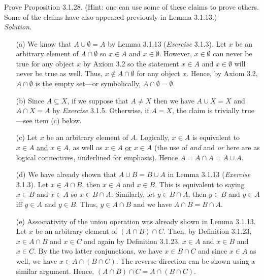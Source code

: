 \documentclass{amsart}
\theoremstyle{definition}
\newcommand{\soln}{\newline\textit{Solution.} }
\begin{document}
\subsubsection{} Prove Proposition 3.1.28. (Hint: one can use some of these claims to prove others. Some of the claims have also appeared previously in Lemma 3.1.13.) \\
\soln
\begin{enumerate}
\item[(a)] We know that $A\cup\emptyset=A$ by Lemma 3.1.13 (\textit{Exercise} 3.1.3). Let $x$ be an arbitrary element of $A\cap\emptyset$ so $x\in A$ and $x\in\emptyset$. However, $x\in\emptyset$ can never be true for any object $x$ by Axiom 3.2 so the statement $x\in A$ and $x\in\emptyset$ will never be true as well. Thus, $x\notin A\cap\emptyset$ for any object $x$. Hence, by Axiom 3.2, $A\cap\emptyset$ is the empty set---or symbolically, $A\cap\emptyset=\emptyset$. \\
\item[(b)] Since $A\subseteq X$, if we suppose that $A\neq X$ then we have $A\cup X=X$ and $A\cap X=A$ by \textit{Exercise} 3.1.5. Otherwise, if $A=X$, the claim is trivially true---see item (c) below. \\
\item[(c)] Let $x$ be an arbitrary element of $A$. Logically, $x\in A$ is equivalent to $x\in A$ \underline{and} $x\in A$, as well as $x\in A$ \underline{or} $x\in A$ (the use of \textit{and} and \textit{or} here are as logical connectives, underlined for emphasis). Hence $A=A\cap A=A\cup A$. \\
\item[(d)] We have already shown that $A\cup B=B\cup A$ in Lemma 3.1.13 (\textit{Exercise} 3.1.3). Let $x\in A\cap B$, then $x\in A$ and $x\in B$. This is equivalent to saying $x\in B$ and $x\in A$ so $x\in B\cap A$. Similarly, let $y\in B\cap A$, then $y\in B$ and $y\in A$ iff $y\in A$ and $y\in B$. Thus, $y\in A\cap B$ and we have $A\cap B=B\cap A$. \\
\item[(e)] Associativity of the union operation was already shown in Lemma 3.1.13. Let $x$ be an arbitrary element of $(A\cap B)\cap C$. Then, by Definition 3.1.23, $x\in A\cap B$ and $x\in C$ and again by Definition 3.1.23, $x\in A$ and $x\in B$ and $x\in C$. By the two latter conjunctions, we have $x\in B\cap C$ and since $x\in A$ as well, we have $x\in A\cap (B\cap C)$. The reverse direction can be shown using a similar argument. Hence, $(A\cap B)\cap C=A\cap (B\cap C)$. \\

\end{enumerate}
\end{document}
